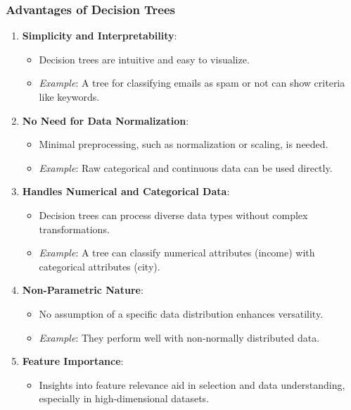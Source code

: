 \documentclass[aspectratio=169]{beamer}
\begin{document}
\begin{frame}[fragile]
    \frametitle{Advantages of Decision Trees}
    \begin{enumerate}
        \item \textbf{Simplicity and Interpretability}:
        \begin{itemize}
            \item Decision trees are intuitive and easy to visualize.
            \item \textit{Example}: A tree for classifying emails as spam or not can show criteria like keywords.
        \end{itemize}

        \item \textbf{No Need for Data Normalization}:
        \begin{itemize}
            \item Minimal preprocessing, such as normalization or scaling, is needed.
            \item \textit{Example}: Raw categorical and continuous data can be used directly.
        \end{itemize}

        \item \textbf{Handles Numerical and Categorical Data}:
        \begin{itemize}
            \item Decision trees can process diverse data types without complex transformations.
            \item \textit{Example}: A tree can classify numerical attributes (income) with categorical attributes (city).
        \end{itemize}

        \item \textbf{Non-Parametric Nature}:
        \begin{itemize}
            \item No assumption of a specific data distribution enhances versatility.
            \item \textit{Example}: They perform well with non-normally distributed data.
        \end{itemize}

        \item \textbf{Feature Importance}:
        \begin{itemize}
            \item Insights into feature relevance aid in selection and data understanding, especially in high-dimensional datasets.
        \end{itemize}
    \end{enumerate}
\end{frame}
\end{document}
